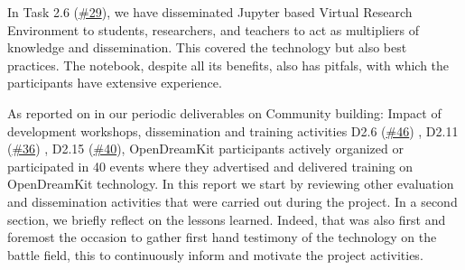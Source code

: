 In Task 2.6
(\href{https://github.com/OpenDreamKit/OpenDreamKit/issues/29}{\#29}),
we have disseminated Jupyter based Virtual Research Environment to
students, researchers, and teachers to act as multipliers of knowledge
and dissemination. This covered the technology but also best practices.
The notebook, despite all its benefits, also has pitfals, with which the
participants have extensive experience.

As reported on in our periodic deliverables on Community building:
Impact of development workshops, dissemination and training activities
D2.6
(\href{https://github.com/OpenDreamKit/OpenDreamKit/issues/46}{\#46}) ,
D2.11
(\href{https://github.com/OpenDreamKit/OpenDreamKit/issues/36}{\#36}) ,
D2.15
(\href{https://github.com/OpenDreamKit/OpenDreamKit/issues/40}{\#40}),
OpenDreamKit participants actively organized or participated in 40
events where they advertised and delivered training on OpenDreamKit
technology. In this report we start by reviewing other evaluation and
dissemination activities that were carried out during the project. In a
second section, we briefly reflect on the lessons learned. Indeed, that
was also first and foremost the occasion to gather first hand testimony
of the technology on the battle field, this to continuously inform and
motivate the project activities.
